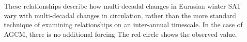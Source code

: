 \documentclass{nature}
\begin{document}
These relationships describe how multi-decadal changes in Eurasian winter SAT vary with multi-decadal changes in circulation, rather than the more standard technique of examining relationships on an inter-annual timescale. In the case of AGCM, there is no additional forcing The red circle shows the observed value. 










\end{document}
